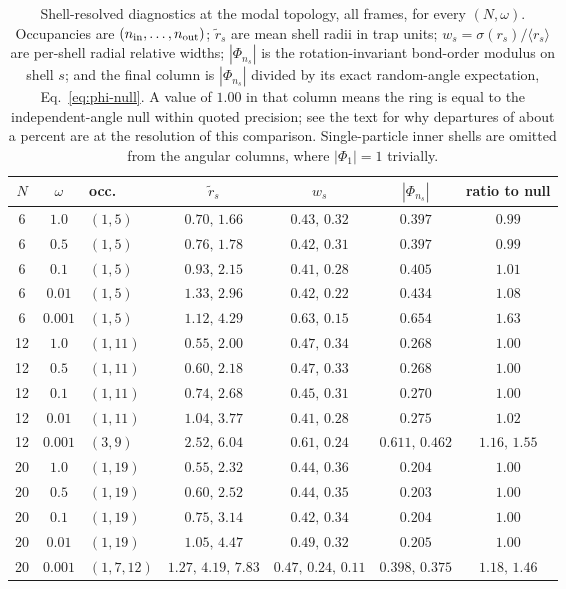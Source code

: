 \begin{table}[H]
\centering
\caption[Shell-resolved diagnostics across the whole grid]{Shell-resolved diagnostics at the modal topology, all frames, for every
$(N,\omega)$. Occupancies are $(n_{\rm in},\dots,n_{\rm out})$; $\tilde r_s$ are mean shell
radii in trap units; $w_s=\sigma(r_s)/\langle r_s\rangle$ are per-shell radial relative
widths; $|\Phi_{n_s}|$
is the rotation-invariant bond-order modulus on shell $s$; and the final column is $|\Phi_{n_s}|$
divided by its exact random-angle expectation, Eq.~\eqref{eq:phi-null}. A value of $1.00$
in that column means the ring is equal to the independent-angle null within quoted
precision; see the text for why departures of about a percent are at the resolution of
this comparison. Single-particle inner shells are omitted from the
angular columns, where $|\Phi_1|=1$ trivially.}
\label{tab:shell-summary}
\small
\setlength{\tabcolsep}{5pt}
\begin{tabular}{ccl cc cc}
\toprule
$N$ & $\omega$ & occ. & $\tilde r_s$ & $w_s$ & $|\Phi_{n_s}|$ & ratio to null \\
\midrule
 6 & $1.0$   & $(1,5)$     & $0.70,\,1.66$ & $0.43,\,0.32$ & $0.397$ & $0.99$ \\
 6 & $0.5$   & $(1,5)$     & $0.76,\,1.78$ & $0.42,\,0.31$ & $0.397$ & $0.99$ \\
 6 & $0.1$   & $(1,5)$     & $0.93,\,2.15$ & $0.41,\,0.28$ & $0.405$ & $1.01$ \\
 6 & $0.01$  & $(1,5)$     & $1.33,\,2.96$ & $0.42,\,0.22$ & $0.434$ & $1.08$ \\
 6 & $0.001$ & $(1,5)$     & $1.12,\,4.29$ & $0.63,\,0.15$ & $\mathbf{0.654}$ & $\mathbf{1.63}$ \\
\midrule
12 & $1.0$   & $(1,11)$    & $0.55,\,2.00$ & $0.47,\,0.34$ & $0.268$ & $1.00$ \\
12 & $0.5$   & $(1,11)$    & $0.60,\,2.18$ & $0.47,\,0.33$ & $0.268$ & $1.00$ \\
12 & $0.1$   & $(1,11)$    & $0.74,\,2.68$ & $0.45,\,0.31$ & $0.270$ & $1.00$ \\
12 & $0.01$  & $(1,11)$    & $1.04,\,3.77$ & $0.41,\,0.28$ & $0.275$ & $1.02$ \\
12 & $0.001$ & $(3,9)$     & $2.52,\,6.04$ & $0.61,\,0.24$ & $\mathbf{0.611,\,0.462}$ & $\mathbf{1.16,\,1.55}$ \\
\midrule
20 & $1.0$   & $(1,19)$    & $0.55,\,2.32$ & $0.44,\,0.36$ & $0.204$ & $1.00$ \\
20 & $0.5$   & $(1,19)$    & $0.60,\,2.52$ & $0.44,\,0.35$ & $0.203$ & $1.00$ \\
20 & $0.1$   & $(1,19)$    & $0.75,\,3.14$ & $0.42,\,0.34$ & $0.204$ & $1.00$ \\
20 & $0.01$  & $(1,19)$    & $1.05,\,4.47$ & $0.49,\,0.32$ & $0.205$ & $1.00$ \\
20 & $0.001$ & $(1,7,12)$  & $1.27,\,4.19,\,7.83$ & $0.47,\,0.24,\,0.11$ & $\mathbf{0.398,\,0.375}$ & $\mathbf{1.18,\,1.46}$ \\
\bottomrule
\end{tabular}
\end{table}

